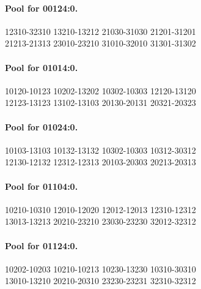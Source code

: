 \documentclass[11pt]{article}
\theoremstyle{remark}
\numberwithin{equation}{section}
\numberwithin{table}{section}
\begin{document}
\paragraph{Pool for 00124:0.}
\begingroup\footnotesize\ttfamily\begin{flushleft}
12310-32310 13210-13212 21030-31030 21201-31201\\
21213-21313 23010-23210 31010-32010 31301-31302\\
\end{flushleft}\endgroup
\paragraph{Pool for 01014:0.}
\begingroup\footnotesize\ttfamily\begin{flushleft}
10120-10123 10202-13202 10302-10303 12120-13120\\
12123-13123 13102-13103 20130-20131 20321-20323\\
\end{flushleft}\endgroup
\paragraph{Pool for 01024:0.}
\begingroup\footnotesize\ttfamily\begin{flushleft}
10103-13103 10132-13132 10302-10303 10312-30312\\
12130-12132 12312-12313 20103-20303 20213-20313\\
\end{flushleft}\endgroup
\paragraph{Pool for 01104:0.}
\begingroup\footnotesize\ttfamily\begin{flushleft}
10210-10310 12010-12020 12012-12013 12310-12312\\
13013-13213 20210-23210 23030-23230 32012-32312\\
\end{flushleft}\endgroup
\paragraph{Pool for 01124:0.}
\begingroup\footnotesize\ttfamily\begin{flushleft}
10202-10203 10210-10213 10230-13230 10310-30310\\
13010-13210 20210-20310 23230-23231 32310-32312\\
\end{flushleft}\endgroup
\end{document}
